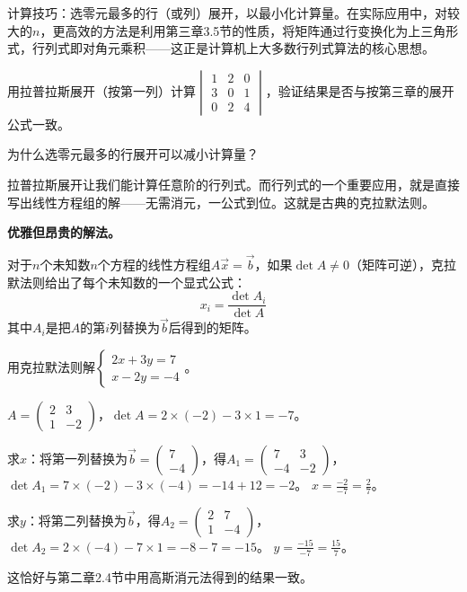 计算技巧：选零元最多的行（或列）展开，以最小化计算量。在实际应用中，对较大的$n$，更高效的方法是利用第三章3.5节的性质，将矩阵通过行变换化为上三角形式，行列式即对角元乘积——这正是计算机上大多数行列式算法的核心思想。

\begin{exercise}
\item 用拉普拉斯展开（按第一列）计算$\begin{vmatrix}1&2&0\\3&0&1\\0&2&4\end{vmatrix}$，验证结果是否与按第三章的展开公式一致。
\item 为什么选零元最多的行展开可以减小计算量？
\end{exercise}

拉普拉斯展开让我们能计算任意阶的行列式。而行列式的一个重要应用，就是直接写出线性方程组的解——无需消元，一公式到位。这就是古典的克拉默法则。


\textbf{优雅但昂贵的解法。}

对于$n$个未知数$n$个方程的线性方程组$A\vec x = \vec b$，如果$\det A\neq0$（矩阵可逆），克拉默法则给出了每个未知数的一个显式公式：
\[
x_i = \frac{\det A_i}{\det A}
\]
其中$A_i$是把$A$的第$i$列替换为$\vec b$后得到的矩阵。

\begin{example}
用克拉默法则解$\begin{cases}2x+3y=7\\x-2y=-4\end{cases}$。
\end{example}
\begin{solution}
$A=\begin{pmatrix}2&3\\1&-2\end{pmatrix}$，$\det A = 2\times(-2)-3\times1 = -7$。

求$x$：将第一列替换为$\vec b=\begin{pmatrix}7\\-4\end{pmatrix}$，得$A_1=\begin{pmatrix}7&3\\-4&-2\end{pmatrix}$，
$\det A_1 = 7\times(-2)-3\times(-4) = -14+12 = -2$。
$x = \frac{-2}{-7} = \frac{2}{7}$。

求$y$：将第二列替换为$\vec b$，得$A_2=\begin{pmatrix}2&7\\1&-4\end{pmatrix}$，
$\det A_2 = 2\times(-4)-7\times1 = -8-7 = -15$。
$y = \frac{-15}{-7} = \frac{15}{7}$。

这恰好与第二章2.4节中用高斯消元法得到的结果一致。
\end{solution}


